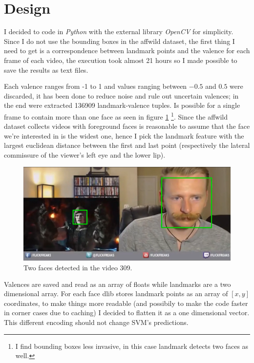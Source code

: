 \section{Design}
I decided to code in \textit{Python} with the external library \textit{OpenCV} for simplicity.
Since I do not use the bounding boxes in the affwild dataset, the first thing I need to get is a correspondence between landmark points and the  valence for each frame of each video, the execution took almost 21 hours so I made possible to save the results as text files.

Each valence ranges from -1 to 1 and values ranging between $-0.5$  and $0.5$ were discarded, it has been done to reduce noise and rule out uncertain valences; in the end were extracted 136909 landmark-valence tuples.
Is possible for a single frame to contain more than one face as seen in figure \ref{fig:double_face} \footnote{I find bounding boxes less invasive, in this case landmark detects two faces as well.}.
Since the affwild dataset collects videos with foreground faces is reasonable to assume that the face we're interested in is the widest one, hence I pick the landmark feature with the largest euclidean distance between the first and last point (respectively the lateral commissure of the viewer's left eye and the lower lip).

\begin{figure}[h!t]
    \centering
    \includegraphics[scale=0.4]{images/309mp4_double_face.png}
    \caption{Two faces detected in the video 309.}
    \label{fig:double_face}
\end{figure}

Valences are saved and read as an array of floats while landmarks are a two dimensional array. 
For each face dlib stores landmark points as an array of $[x,y]$ coordinates, to make things more readable (and possibily to make the code faster in corner cases due to caching) I decided to flatten it as a one dimensional vector.
This different encoding should not change SVM's predictions.

